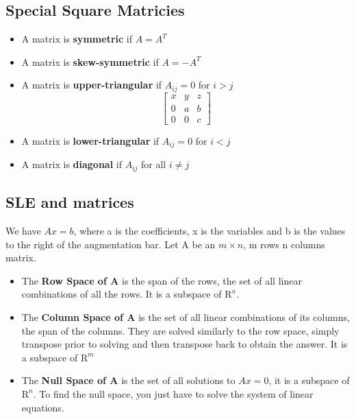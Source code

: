 \documentclass[11pt]{book}
\begin{document}
{{\subsection{Special Square Matricies}
\begin{itemize}
	\item{A matrix is \textbf{symmetric} if $A=A^{T}$}
	\item{A matrix is \textbf{skew-symmetric} if $A=-A^{T}$}
	\item{A matrix is \textbf{upper-triangular} if $A_{ij}=0$ for $i>j$ \[
	\left[
	\begin{matrix}
		x & y & z \\
		0 & a & b \\
		0 & 0 & c
	\end{matrix} 
	\right]
	\] }
	\item{A matrix is \textbf{lower-triangular} if $A_{ij}=0$ for $i<j$}
	\item{A matrix is \textbf{diagonal} if $A_{ij}$ for all $i\ne j$}
\end{itemize}
\subsection{SLE and matrices}
\par{We have $Ax=b$, where a is the coefficients, x is the variables and b is the values to the right of the augmentation bar. Let A be an $m\times n$, m rows n columns matrix. 
\begin{itemize}
	\item{The \textbf{Row Space of A} is the span of the rows, the set of all linear combinations of all the rows. It is a subspace of $\mathrm{R}^{n}$.}
	\item{The \textbf{Column Space of A} is the set of all linear combinations of its columns, the span of the columns. They are solved similarly to the row space, simply transpose prior to solving and then transpose back to obtain the answer. It is a subspace of $\mathrm{R}^{m}$}
	\item{The \textbf{Null Space of A} is the set of all solutions to $Ax=0$, it is a subspace of $\mathrm{R}^{n}$. To find the null space, you just have to solve the system of linear equations.}
\end{itemize}
}
}}
\end{document}
